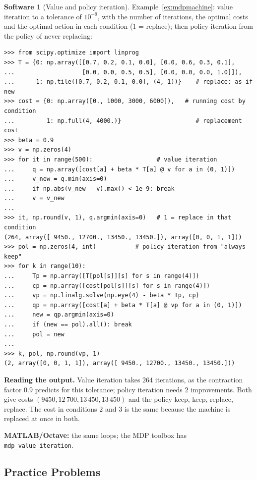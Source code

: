 \documentclass[11pt,a4paper]{article}
\numberwithin{equation}{section}
\theoremstyle{definition}
\newtheorem{software}[thm]{Software}
\begin{document}
\begin{software}[Value and policy iteration]
\label{sw:mdp}
Example~\ref{ex:mdpmachine}: value iteration to a tolerance of $10^{-9}$, with the number of iterations, the optimal costs and the optimal action in each condition ($1$ = replace); then policy iteration from the policy of never replacing:
{\small\begin{verbatim}
>>> from scipy.optimize import linprog
>>> T = {0: np.array([[0.7, 0.2, 0.1, 0.0], [0.0, 0.6, 0.3, 0.1],
...                   [0.0, 0.0, 0.5, 0.5], [0.0, 0.0, 0.0, 1.0]]),
...      1: np.tile([0.7, 0.2, 0.1, 0.0], (4, 1))}    # replace: as if new
>>> cost = {0: np.array([0., 1000, 3000, 6000]),   # running cost by condition
...         1: np.full(4, 4000.)}                     # replacement cost
>>> beta = 0.9
>>> v = np.zeros(4)
>>> for it in range(500):                  # value iteration
...     q = np.array([cost[a] + beta * T[a] @ v for a in (0, 1)])
...     v_new = q.min(axis=0)
...     if np.abs(v_new - v).max() < 1e-9: break
...     v = v_new
...
>>> it, np.round(v, 1), q.argmin(axis=0)   # 1 = replace in that condition
(264, array([ 9450., 12700., 13450., 13450.]), array([0, 0, 1, 1]))
>>> pol = np.zeros(4, int)           # policy iteration from "always keep"
>>> for k in range(10):
...     Tp = np.array([T[pol[s]][s] for s in range(4)])
...     cp = np.array([cost[pol[s]][s] for s in range(4)])
...     vp = np.linalg.solve(np.eye(4) - beta * Tp, cp)
...     qp = np.array([cost[a] + beta * T[a] @ vp for a in (0, 1)])
...     new = qp.argmin(axis=0)
...     if (new == pol).all(): break
...     pol = new
...
>>> k, pol, np.round(vp, 1)
(2, array([0, 0, 1, 1]), array([ 9450., 12700., 13450., 13450.]))
\end{verbatim}}
\textbf{Reading the output.} Value iteration takes $264$ iterations, as the contraction factor $0.9$ predicts for this tolerance; policy iteration needs $2$ improvements. Both give costs $(9450, 12\,700, 13\,450, 13\,450)$ and the policy keep, keep, replace, replace. The cost in conditions $2$ and $3$ is the same because the machine is replaced at once in
both.

\textbf{MATLAB/Octave:} the same loops; the MDP toolbox has \texttt{mdp\_value\_iteration}.
\end{software}

\subsection{Practice Problems}
\end{document}
